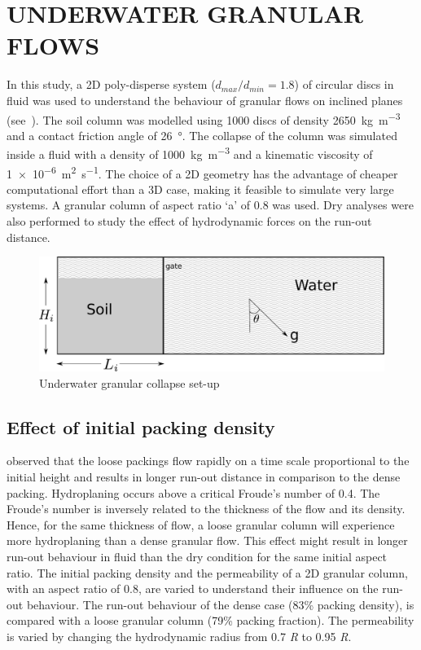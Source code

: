 \documentclass[12pt,a4paper,twocolumn,fleqn]{narms}
\begin{document}
\section{UNDERWATER GRANULAR FLOWS}
In this study, a 2D poly-disperse system ($d_{max}/d_{min} = 1.8$) of circular discs in fluid was used to understand the behaviour of granular flows on inclined planes (see~). The soil column was modelled using 1000 discs of density \SI{2650}{\kg\per\cubic\meter} and a contact friction angle of \SI{26}{\degree}. The collapse of the column was simulated inside a fluid with a density of \SI{1000}{\kg\per\cubic\meter}  and a kinematic viscosity of \SI{1e-6}{\square\meter\per\second}. The choice of a 2D geometry has the advantage of cheaper computational effort than a 3D case, making it feasible to simulate very large systems. A granular column of aspect ratio `a' of 0.8 was used. Dry analyses were also performed to study the effect of hydrodynamic forces on the run-out distance.

\begin{figure}[htpb]
\includegraphics[width=0.97\columnwidth]{figs/geometry.pdf}
\caption{Underwater granular collapse set-up}
\label{fig:setup}
\end{figure}

\subsection{Effect of initial packing density}

 observed that the loose packings flow rapidly on a time
scale proportional to the initial height and results in longer run-out distance 
in comparison to the dense packing. Hydroplaning occurs above a critical 
Froude's number of 0.4. The Froude's number is inversely related to the 
thickness of the flow and its density. Hence, for the same thickness of flow, a 
loose granular column will experience more hydroplaning than a dense granular 
flow. This effect might result in longer run-out behaviour in fluid than the 
dry condition for the same initial aspect ratio. The initial packing density 
and the permeability of a 2D granular column, with an aspect ratio of 0.8, are 
varied to understand their influence on the run-out behaviour. The run-out 
behaviour of the dense case (83\% packing density), is compared with a loose
granular column (79\% packing fraction). The permeability is varied by changing
the hydrodynamic radius from 0.7 \textit{R} to 0.95 \textit{R}. 
\end{document}
